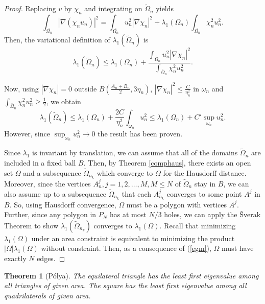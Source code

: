 \documentclass[12pt]{report}
\newtheorem{theorem}{Theorem}[section]
\numberwithin{definition}{section}
\begin{document}
\begin{proof}
  Replacing $v$ by $\chi_{n}$ and integrating on $\widetilde{\Omega}_{n}$ yields
  \[
    \int_{ \overline{\Omega_{n}}} \! | \nabla (\chi_{n}u_{n}) |^2 = \int_{ \overline{\Omega_{n}}} \! u_{n}^{2}| \nabla \chi_{n} |^2 + \lambda_{1}(\Omega_{n}) \int_{ \overline{\Omega_{n}}} \! \chi_{n}^2 u_{n}^2  
  .\] 
  Then, the variational definition of $\lambda_{1}(\widetilde{\Omega}_{n})$ is
  \[
  \lambda_{1}(\widetilde{\Omega}_{n}) \leq \lambda_{1}(\Omega_{n}) + \frac{\int_{ \overline{\Omega}_{n}} \! u_{n}^2 | \nabla \chi_{n} |^2 }{\int_{ \overline{\Omega}_{n}} \! \chi_{n}^2 u_{n}^2 }
  .\] 

  Now, using $| \nabla \chi_{n} | = 0$ outside $B(\frac{A_{n} + B_{n}}{2}, 3\eta_{n})$, $| \nabla \chi_{n} |^2 \leq \frac{C}{\eta_{n}^{2}}$ in $\omega_{n}$ and $\int_{ \overline{\Omega}_{n}} \! \chi_{n}^{2}u_{n}^{2} \geq \frac{1}{2} $, we obtain
  \[
  \lambda_{1}(\widetilde{\Omega}_{n}) \leq \lambda_{1}(\Omega_{n}) + \frac{2C}{\eta_{n}^{2}} \int_{ \omega_{n}} \! u_{n}^{2} \leq \lambda_{1}(\Omega_{n}) + C' \sup_{\omega_{n}} u_{n}^{2} 
  .\] 
  However, since $\sup_{\omega_{n}} u_{n}^{2} \to 0$ the result has been proven.


  Since $\lambda_{1}$ is invariant by translation, we can assume that all of the domains $\widetilde{\Omega}_{n}$ are included in a fixed ball $B$.
  Then, by Theorem \ref{comphaus}, there exists an open set $\Omega$ and a subsequence $\widetilde{\Omega}_{n_{k}}$ which converge to $\Omega$ for the Hausdorff distance.
  Moreover, since the vertices $A_{n}^{j}, j = 1,2,\ldots,M, M \leq N$ of $\widetilde{\Omega}_{n}$ stay in $B$, we can also assume up to a subsequence $\widetilde{\Omega}_{n_{k}}$ that each $A_{n_{k}}^{j}$ converges to some point $A^{j}$ in $B$.
  So, using Hausdorff convergence, $\Omega$ must be a polygon with vertices $A^{j}$.
  Further, since any polygon in $P_{N}$ has at most $N / 3$ holes, we can apply the Šverak Theorem to show $\lambda_{1}(\widetilde{\Omega}_{n_{k}})$ converges to $\lambda_{1}(\Omega)$.
  Recall that minimizing $\lambda_{1}(\Omega)$ under an area constraint is equivalent to minimizing the product $| \Omega |\lambda_{1}(\Omega)$ without constraint.
  Then, as a consequence of (\ref{egm}), $\Omega$ must have exactly $N$ edges.
\end{proof}


\begin{theorem}[Pólya]
  The equilateral triangle has the least first eigenvalue among all triangles of given area.
  The square has the least first eigenvalue among all quadrilaterals of given area.
\end{theorem}
\end{document}
